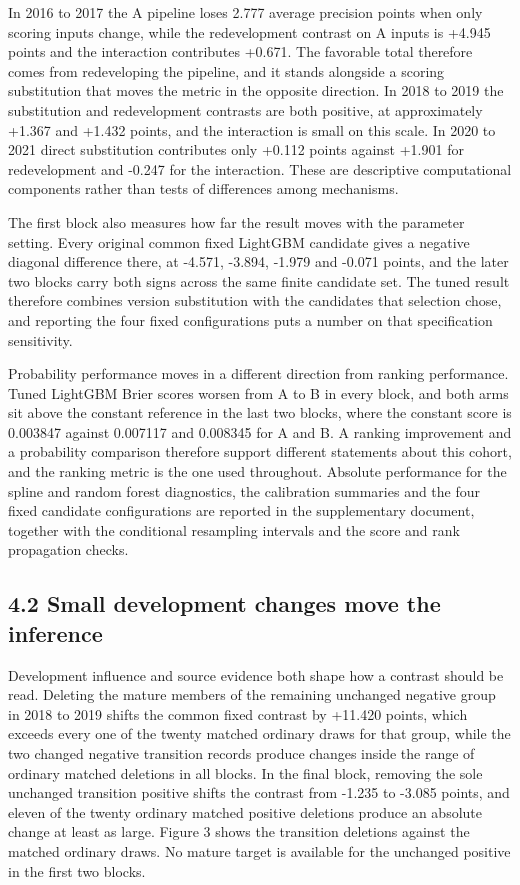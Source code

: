 \documentclass[10pt,a4paper,twocolumn]{article}
\begin{document}
In 2016 to 2017 the A pipeline loses 2.777 average precision points when only scoring inputs change, while the redevelopment contrast on A inputs is +4.945 points and the interaction contributes +0.671. The favorable total therefore comes from redeveloping the pipeline, and it stands alongside a scoring substitution that moves the metric in the opposite direction. In 2018 to 2019 the substitution and redevelopment contrasts are both positive, at approximately +1.367 and +1.432 points, and the interaction is small on this scale. In 2020 to 2021 direct substitution contributes only +0.112 points against +1.901 for redevelopment and -0.247 for the interaction. These are descriptive computational components rather than tests of differences among mechanisms.

The first block also measures how far the result moves with the parameter setting. Every original common fixed LightGBM candidate gives a negative diagonal difference there, at -4.571, -3.894, -1.979 and -0.071 points, and the later two blocks carry both signs across the same finite candidate set. The tuned result therefore combines version substitution with the candidates that selection chose, and reporting the four fixed configurations puts a number on that specification sensitivity.

Probability performance moves in a different direction from ranking performance. Tuned LightGBM Brier scores worsen from A to B in every block, and both arms sit above the constant reference in the last two blocks, where the constant score is 0.003847 against 0.007117 and 0.008345 for A and B. A ranking improvement and a probability comparison therefore support different statements about this cohort, and the ranking metric is the one used throughout. Absolute performance for the spline and random forest diagnostics, the calibration summaries and the four fixed candidate configurations are reported in the supplementary document, together with the conditional resampling intervals and the score and rank propagation checks.

\subsection{4.2 Small development changes move the inference}

Development influence and source evidence both shape how a contrast should be read. Deleting the mature members of the remaining unchanged negative group in 2018 to 2019 shifts the common fixed contrast by +11.420 points, which exceeds every one of the twenty matched ordinary draws for that group, while the two changed negative transition records produce changes inside the range of ordinary matched deletions in all blocks. In the final block, removing the sole unchanged transition positive shifts the contrast from -1.235 to -3.085 points, and eleven of the twenty ordinary matched positive deletions produce an absolute change at least as large. Figure 3 shows the transition deletions against the matched ordinary draws. No mature target is available for the unchanged positive in the first two blocks.
\end{document}
